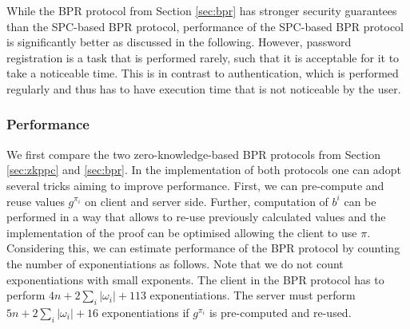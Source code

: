 While the \ac{BPR} protocol from Section \ref{sec:bpr} has stronger security guarantees than the \ac{SPC}-based \ac{BPR} protocol, performance of the \ac{SPC}-based \ac{BPR} protocol is significantly better as discussed in the following.
However, password registration is a task that is performed rarely, such that it is acceptable for it to take a noticeable time. 
This is in contrast to authentication, which is performed regularly and thus has to have execution time that is not noticeable by the user.

\subsubsection{Performance}
We first compare the two zero-knowledge-based \ac{BPR} protocols from Section \ref{sec:zkppc} and \ref{sec:bpr}.
In the implementation of both protocols one can adopt several tricks aiming to improve performance. 
First, we can pre-compute and reuse values $g^{\pi_i}$ on client and server side.
Further, computation of $b^i$ can be performed in a way that allows to re-use previously calculated values and the implementation of the proof can be optimised allowing the client to use $\pi$.
Considering this, we can estimate performance of the \ac{BPR} protocol by counting the number of exponentiations as follows.
Note that we do not count exponentiations with small exponents.
%
The client in the \ac{BPR} protocol has to perform $4n+2\sum_i |\omega_i| + 113$ exponentiations.
The server must perform $5n + 2\sum_i |\omega_i| + 16$ exponentiations if $g^{\pi_i}$ is pre-computed and re-used.
